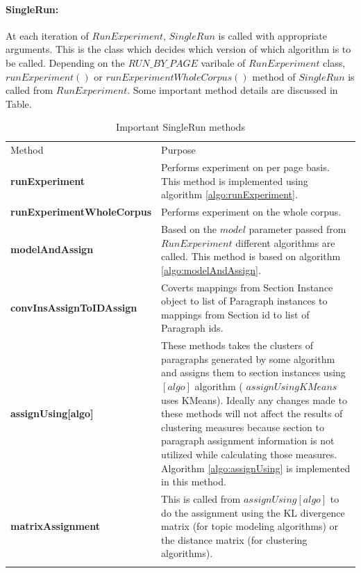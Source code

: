 \paragraph{SingleRun: }
At each iteration of $RunExperiment$, $SingleRun$ is called with appropriate arguments. This is the class which decides which version of which algorithm is to be called. Depending on the $RUN\_BY\_PAGE$ varibale of $RunExperiment$ class, $runExperiment()$ or $runExperimentWholeCorpus()$ method of $SingleRun$ is called from $RunExperiment$. Some important method details are discussed in Table.
\begin{table}
\caption{Important SingleRun methods}
\label{tab:iter}       %
\begin{tabular}{l|p{60mm}}
\hline\noalign{\smallskip}
Method & Purpose  \\
\noalign{\smallskip}\hline\noalign{\smallskip}
\textbf{runExperiment} & Performs experiment on per page basis. This method is implemented using algorithm \ref{algo:runExperiment}. \\
\hline
\textbf{runExperimentWholeCorpus} & Performs experiment on the whole corpus. \\
\hline
\textbf{modelAndAssign} & Based on the $model$ parameter passed from $RunExperiment$ different algorithms are called. This method is based on algorithm \ref{algo:modelAndAssign}. \\
\hline
\textbf{convInsAssignToIDAssign} & Coverts mappings from Section Instance object to list of Paragraph instances to mappings from Section id to list of Paragraph ids. \\
\hline
\textbf{assignUsing[algo]} & These methods takes the clusters of paragraphs generated by some algorithm and assigns them to section instances using $[algo]$ algorithm ( $assignUsingKMeans$ uses KMeans). Ideally any changes made to these methods will not affect the results of clustering measures because section to paragraph assignment information is not utilized while calculating those measures. Algorithm \ref{algo:assignUsing} is implemented in this method. \\
\hline
\textbf{matrixAssignment} & This is called from $assignUsing[algo]$ to do the assignment using the KL divergence matrix (for topic modeling algorithms) or the distance matrix (for clustering algorithms). \\
\noalign{\smallskip}\hline
\end{tabular}
\end{table}


